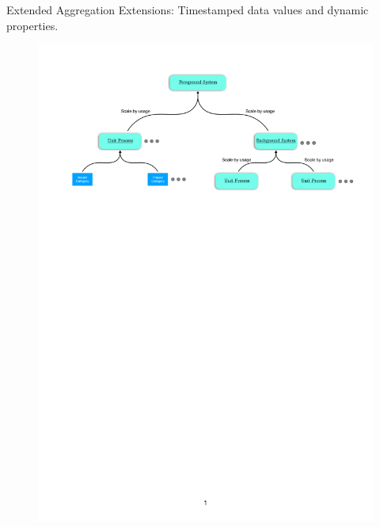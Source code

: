 \begin{frame}{Extended Aggregation}
\vfill
Extensions: Timestamped data values and dynamic properties.
\vfill
\begin{figure}
    \centering
    \includegraphics[page=2, width = \linewidth]{.figures/ImpactAggregationExtension.pdf}
\end{figure}

\end{frame}